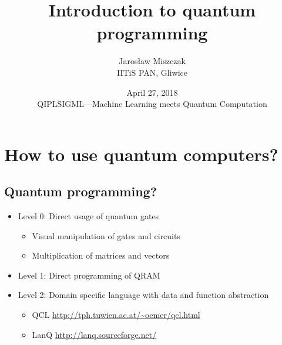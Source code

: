 \documentclass{beamer}
\title{Introduction to quantum programming}
\author{Jaros\l aw Miszczak\\ IITiS PAN, Gliwice}
\date{April 27, 2018\\ QIPLSIGML---Machine Learning meets Quantum Computation}
\begin{document}
\begin{frame}{}
   \maketitle 
\end{frame}

\begin{frame}{}
    \tableofcontents
\end{frame}



\section{How to use quantum computers?}

\subsection{Quantum programming?}

\begin{frame}{\insertsection}{\insertsubsection}
	
	
\end{frame}

\begin{frame}{\insertsection}{\insertsubsection}

  \begin{itemize}
    \item Level 0: Direct usage of quantum gates
        \begin{itemize}
            \item Visual manipulation of gates and circuits
            \item Multiplication of matrices and vectors 
        \end{itemize}
    \item Level 1: Direct programming of QRAM 
    \item Level 2: Domain specific language with data and function abstraction
        \begin{itemize}
            \item QCL \url{http://tph.tuwien.ac.at/~oemer/qcl.html}
            \item LanQ \url{http://lanq.sourceforge.net/}
        \end{itemize}
  \end{itemize}
\end{frame}
\end{document}
